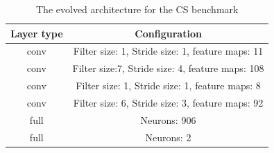 \documentclass[conference]{IEEEtran}
\begin{document}
\begin{table}[!t]
	\renewcommand{\arraystretch}{1.3}
	\caption{The evolved architecture for the CS benchmark}
	\label{table:EvolvedConvexCNN}
	\centering
	\begin{tabular}{|c|c|}
		\hline
		Layer type & Configuration\\
		\hline
		conv & Filter size: 1, Stride size: 1, feature maps: 11\\
		\hline
		conv & Filter size:7, Stride size: 4, feature maps: 108\\
		\hline
		conv & Filter size: 1, Stride size: 1, feature maps: 8\\
		\hline
		conv & Filter size: 6, Stride size: 3, feature maps: 92\\
		\hline
		full & Neurons: 906\\
		\hline
		full & Neurons: 2\\
		\hline
	\end{tabular}
\end{table}
\end{document}
